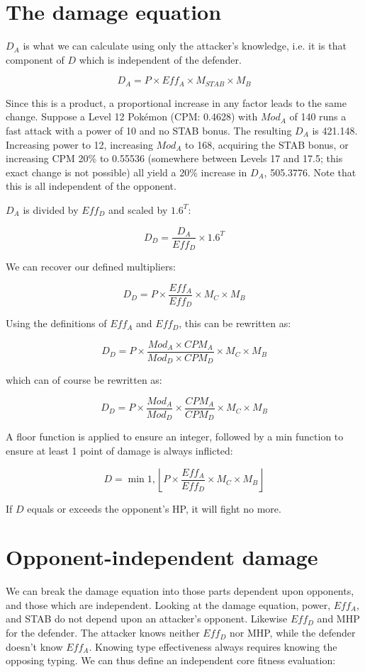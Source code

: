 \section{The damage equation\label{sec:damage}}

$D_A$ is what we can calculate using only the attacker's knowledge, i.e.
 it is that component of $D$ which is independent of the defender.

\[ D_A = P \times Eff_A \times M_{STAB} \times M_B \]

Since this is a product, a proportional increase in any factor leads to
 the same change.
Suppose a Level 12 Pokémon (CPM: 0.4628) with $Mod_A$ of 140 runs
  a fast attack with a power of 10 and no STAB bonus.
The resulting $D_A$ is 421.148.
Increasing power to 12,
 increasing $Mod_A$ to 168,
 acquiring the STAB bonus,
 or increasing CPM 20\% to 0.55536 (somewhere between Levels 17 and 17.5; this exact change is not possible)
 all yield a 20\% increase in $D_A$, 505.3776.
Note that this is all independent of the opponent.

$D_A$ is divided by $Eff_D$ and scaled by $1.6^T$:

\[ D_D = \frac{D_A}{Eff_D} \times 1.6^T \]

We can recover our defined multipliers:

\[ D_D = P \times \frac{Eff_A}{Eff_D} \times M_C \times M_B \]

Using the definitions of $Eff_A$ and $Eff_D$, this can be rewritten as:

\[ D_D = P \times \frac{Mod_A \times CPM_A}{Mod_D \times CPM_D} \times M_C \times M_B \]

which can of course be rewritten as:

\[ D_D = P \times \frac{Mod_A}{Mod_D} \times \frac{CPM_A}{CPM_D} \times M_C \times M_B \]

A floor function is applied to ensure an integer,
 followed by a min function to ensure at least 1 point of damage is always inflicted:

\[ D = \min{1, \left\lfloor P \times \frac{Eff_A}{Eff_D} \times M_C \times M_B \right\rfloor } \]

If $D$ equals or exceeds the opponent's HP, it will fight no more.

\section{Opponent-independent damage}
We can break the damage equation into those parts dependent upon opponents, and those which are independent.
Looking at the damage equation, power, $Eff_A$, and STAB do not depend upon an attacker's opponent.
Likewise $Eff_D$ and MHP for the defender.
The attacker knows neither $Eff_D$ nor MHP, while the defender doesn't know $Eff_A$.
Knowing type effectiveness always requires knowing the opposing typing.
We can thus define an independent core fitness evaluation:

